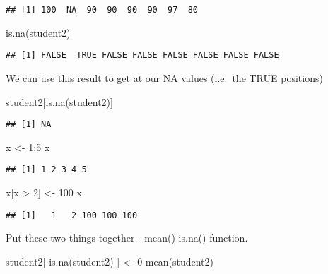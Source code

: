 \documentclass[
]{article}
\newenvironment{Shaded}{\begin{snugshade}}{\end{snugshade}}
\newcommand{\DecValTok}[1]{\textcolor[rgb]{0.00,0.00,0.81}{#1}}
\newcommand{\FunctionTok}[1]{\textcolor[rgb]{0.00,0.00,0.00}{#1}}
\newcommand{\NormalTok}[1]{#1}
\newcommand{\OtherTok}[1]{\textcolor[rgb]{0.56,0.35,0.01}{#1}}
\newcommand{\SpecialCharTok}[1]{\textcolor[rgb]{0.00,0.00,0.00}{#1}}
\begin{document}
\begin{verbatim}
## [1] 100  NA  90  90  90  90  97  80
\end{verbatim}

\begin{Shaded}
\begin{Highlighting}[]
\FunctionTok{is.na}\NormalTok{(student2)}
\end{Highlighting}
\end{Shaded}

\begin{verbatim}
## [1] FALSE  TRUE FALSE FALSE FALSE FALSE FALSE FALSE
\end{verbatim}

We can use this result to get at our NA values (i.e.~the TRUE positions)

\begin{Shaded}
\begin{Highlighting}[]
\NormalTok{student2[}\FunctionTok{is.na}\NormalTok{(student2)]}
\end{Highlighting}
\end{Shaded}

\begin{verbatim}
## [1] NA
\end{verbatim}

\begin{Shaded}
\begin{Highlighting}[]
\NormalTok{x }\OtherTok{\textless{}{-}} \DecValTok{1}\SpecialCharTok{:}\DecValTok{5}
\NormalTok{x}
\end{Highlighting}
\end{Shaded}

\begin{verbatim}
## [1] 1 2 3 4 5
\end{verbatim}

\begin{Shaded}
\begin{Highlighting}[]
\NormalTok{x[x }\SpecialCharTok{\textgreater{}} \DecValTok{2}\NormalTok{] }\OtherTok{\textless{}{-}} \DecValTok{100}
\NormalTok{x}
\end{Highlighting}
\end{Shaded}

\begin{verbatim}
## [1]   1   2 100 100 100
\end{verbatim}

Put these two things together - mean() is.na() function.

\begin{Shaded}
\begin{Highlighting}[]
\NormalTok{student2[ }\FunctionTok{is.na}\NormalTok{(student2) ] }\OtherTok{\textless{}{-}} \DecValTok{0}
\FunctionTok{mean}\NormalTok{(student2)}
\end{Highlighting}
\end{Shaded}
\end{document}
